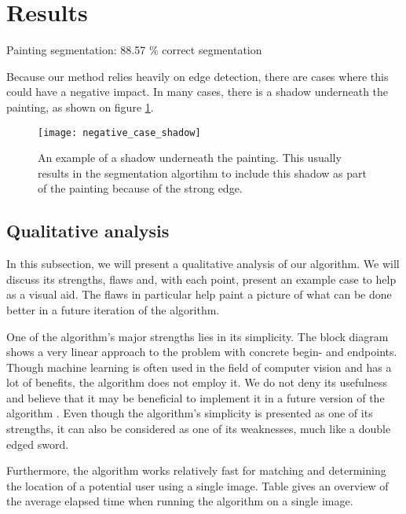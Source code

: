 \section{Results}
	Painting segmentation: 88.57 \% correct segmentation
	
	
	
	Because our method relies heavily on edge detection, there are cases where this could have a negative impact. In many cases, there is a shadow underneath the painting, as shown on figure \ref{fig:negative_case_shadow}.
	
	\begin{figure}
		\texttt{[image: negative\_case\_shadow]}
		\caption{An example of a shadow underneath the painting. This usually results in the segmentation algortihm to include this shadow as part of the painting because of the strong edge.}
		\label{fig:negative_case_shadow}
	\end{figure}


\subsection{Qualitative analysis}
In this subsection, we will present a qualitative analysis of our algorithm. We will discuss its strengths, flaws and, with each point, present an example case to help as a visual aid. The flaws in particular help paint a picture of what can be done better in a future iteration of the algorithm. 


One of the algorithm's major strengths lies in its simplicity. The block diagram shows a very linear approach to the problem with concrete begin- and endpoints. Though machine learning is often used in the field of computer vision and has a lot of benefits, the algorithm does not employ it. We do not deny its usefulness and believe that it may be beneficial to implement it in a future version of the algorithm . Even though the algorithm's simplicity is presented as one of its strengths, it can also be considered as one of its weaknesses, much like a double edged sword.


Furthermore, the algorithm works relatively fast for matching and determining the location of a potential user using a single image. Table  gives an overview of the average elapsed time when running the algorithm on a single image. 



